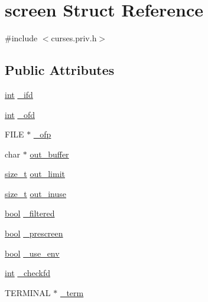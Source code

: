 \hypertarget{structscreen}{\section{screen Struct Reference}
\label{structscreen}
}


{\ttfamily \#include $<$curses.\-priv.\-h$>$}

\subsection*{Public Attributes}
\begin{DoxyCompactItemize}
\item 
\hyperlink{term__entry_8h_ad65b480f8c8270356b45a9890f6499ae}{int} \hyperlink{structscreen_a4791ead31bf7c67b878a7cb8372560bf}{\-\_\-ifd}
\item 
\hyperlink{term__entry_8h_ad65b480f8c8270356b45a9890f6499ae}{int} \hyperlink{structscreen_a1b6595b19a7042f8f9ed0d020abeba95}{\-\_\-ofd}
\item 
F\-I\-L\-E $\ast$ \hyperlink{structscreen_accd371de79c3df86d7f0f086bcbd5828}{\-\_\-ofp}
\item 
char $\ast$ \hyperlink{structscreen_a5fb356db7d7ae2430c566bc0bc7d03e5}{out\-\_\-buffer}
\item 
\hyperlink{nc__alloc_8h_a7b60c5629e55e8ec87a4547dd4abced4}{size\-\_\-t} \hyperlink{structscreen_a44fccdfd249b6f4070dcb219906d3bb2}{out\-\_\-limit}
\item 
\hyperlink{nc__alloc_8h_a7b60c5629e55e8ec87a4547dd4abced4}{size\-\_\-t} \hyperlink{structscreen_ab2c623385ed29c668c355def87c0496d}{out\-\_\-inuse}
\item 
\hyperlink{term__entry_8h_a002004ba5d663f149f6c38064926abac}{bool} \hyperlink{structscreen_a1d7a73abb413ab29e337a6599cd495b5}{\-\_\-filtered}
\item 
\hyperlink{term__entry_8h_a002004ba5d663f149f6c38064926abac}{bool} \hyperlink{structscreen_a6501ad160004783ccdf51bdfc548e86e}{\-\_\-prescreen}
\item 
\hyperlink{term__entry_8h_a002004ba5d663f149f6c38064926abac}{bool} \hyperlink{structscreen_ab3d264d67173168c34ff3c47e5e54d3b}{\-\_\-use\-\_\-env}
\item 
\hyperlink{term__entry_8h_ad65b480f8c8270356b45a9890f6499ae}{int} \hyperlink{structscreen_a8e1f19e450b0d545e70542060b6b308b}{\-\_\-checkfd}
\item 
T\-E\-R\-M\-I\-N\-A\-L $\ast$ \hyperlink{structscreen_af5a8664a3f4cd718ab41f652a9e16982}{\-\_\-term}
\item 

\end{DoxyCompactItemize}

